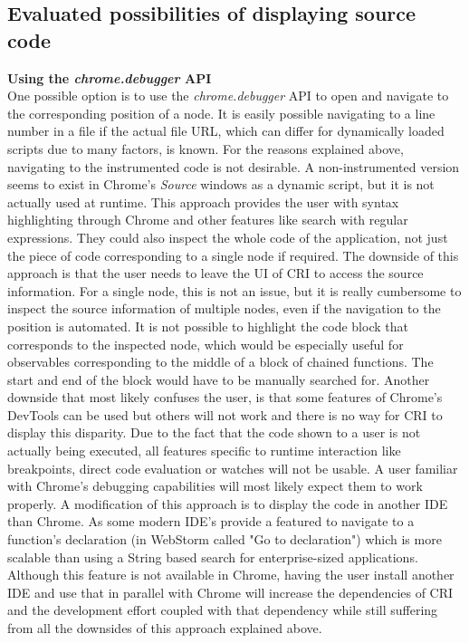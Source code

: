 \subsection{Evaluated possibilities of displaying source code}
\textbf{Using the \emph{chrome.debugger} API}\\
One possible option is to use the \emph{chrome.debugger} API to open and navigate to the corresponding position of a node. It is easily possible navigating to a line number in a file if the actual file URL, which can differ for dynamically loaded scripts due to many factors, is known. For the reasons explained above, navigating to the instrumented code is not desirable. A non-instrumented version seems to exist in Chrome's \emph{Source} windows as a dynamic script, but it is not actually used at runtime. This approach provides the user with syntax highlighting through Chrome and other features like search with regular expressions. They could also inspect the whole code of the application, not just the piece of code corresponding to a single node if required. The downside of this approach is that the user needs to leave the UI of CRI to access the source information. For a single node, this is not an issue, but it is really cumbersome to inspect the source information of multiple nodes, even if the navigation to the position is automated. It is not possible to highlight the code block that corresponds to the inspected node, which would be especially useful for observables corresponding to the middle of a block of chained functions. The start and end of the block would have to be manually searched for. Another downside that most likely confuses the user, is that some features of Chrome's DevTools can be used but others will not work and there is no way for CRI to display this disparity. Due to the fact that the code shown to a user is not actually being executed, all features specific to runtime interaction like breakpoints, direct code evaluation or watches will not be usable. A user familiar with Chrome's debugging capabilities will most likely expect them to work properly. A modification of this approach is to display the code in another IDE than Chrome. As some modern IDE's provide a featured to navigate to a function's declaration (in WebStorm called "Go to declaration") which is more scalable than using a String based search for enterprise-sized applications. Although this feature is not available in Chrome, having the user install another IDE and use that in parallel with Chrome will increase the dependencies of CRI and the development effort coupled with that dependency while still suffering from all the downsides of this approach explained above.\\

